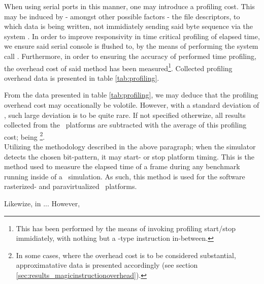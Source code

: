
When using serial ports in this manner, one may introduce a profiling cost.
This may be induced by - amongst other possible factors - the file descriptors, to which data is being written, not immidiately sending said byte sequence via the system \dvttermuart .
In order to improve responsivity in time critical profiling of elapsed time, we ensure said serial console is flushed to, by the means of performing the system call .
Furthermore, in order to ensuring the accuracy of performed time profiling, the overhead cost of said method has been measured\footnote{This has been performed by the means of invoking profiling start/stop immidiately, with nothing but a -type instruction in-between.}.
Collected profiling overhead data is presented in table \ref{tab:profiling}.



From the data presented in table \ref{tab:profiling}, we may deduce that the profiling overhead cost may occationally be volotile.
However, with a standard deviation of , such large deviation is to be quite rare.
If not specified otherwize, all results collected from the \dvttermsimics\ platforms are subtracted with the average of this profiling cost; being \footnote{In some cases, where the overhead cost is to be considered substantial, approximatative data is presented accordingly (see section \ref{sec:results_magicinstructionoverhead}).}.\\

\noindent
Utilizing the methodology described in the above paragraph; when the simulator detects the chosen bit-pattern, it may start- or stop platform timing.
This is the method used to measure the elapsed time of a frame during any benchmark running inside of a \dvttermsimics\ simulation.
As such, this method is used for the software rasterized- and paravirtualized \dvttermsimics\ platforms. 

Likewize, in \dvttermqemu ...
However,


